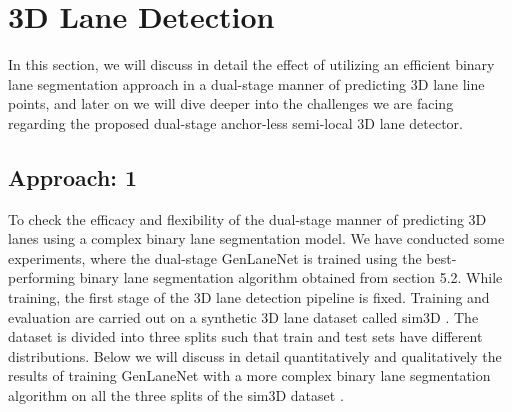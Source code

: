     \section{3D Lane Detection}
    In this section, we will discuss in detail the effect of utilizing an efficient binary lane segmentation approach in a dual-stage manner of predicting 3D lane line points, and later on we will dive deeper into the challenges we are facing regarding the proposed dual-stage anchor-less semi-local 3D lane detector.  
    \subsection{Approach: 1}
    To check the efficacy and flexibility of the dual-stage manner of predicting 3D lanes using a complex binary lane segmentation model. We have conducted some experiments, where the dual-stage GenLaneNet \cite{guo2020gen} is trained using the best-performing binary lane segmentation algorithm obtained from section 5.2. 
    While training, the first stage of the 3D lane detection pipeline is fixed. Training and evaluation are carried out on a synthetic 3D lane dataset called sim3D \cite{guo2020gen}. The dataset is divided into three splits such that train and test sets have different distributions. Below we will discuss in detail quantitatively and qualitatively the results of training GenLaneNet \cite{guo2020gen} with a more complex binary lane segmentation algorithm on all the three splits of the sim3D dataset \cite{guo2020gen}.
 

